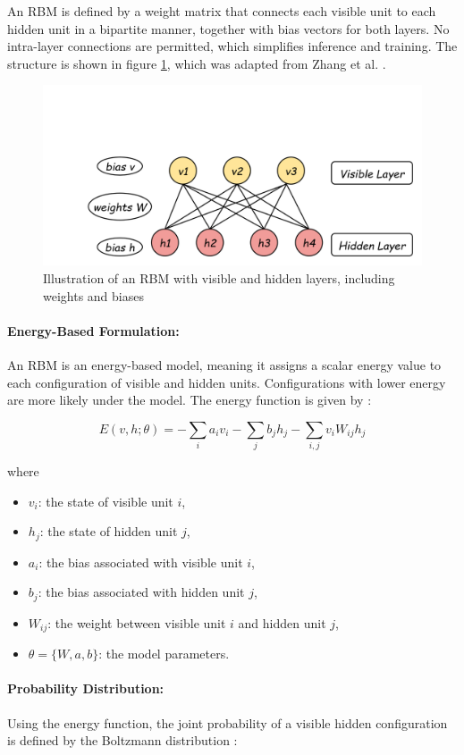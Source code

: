 An RBM is defined by a weight matrix that connects each visible unit to each hidden unit in a bipartite manner, together with bias vectors for both layers. No intra-layer connections are permitted, which simplifies inference and training. The structure is shown in figure \ref{fig:singlerbm}, which was adapted from Zhang et al. \cite{zhang2017deep}.

\begin{figure}[ht]
	\centering
	\includegraphics[width=0.7\linewidth]{Chapters/images/singleRBM}
	\caption{Illustration of an RBM with visible and hidden layers, including weights and biases \cite{zhang2017deep}}
	\label{fig:singlerbm}
\end{figure}

\paragraph{Energy-Based Formulation: } 
An RBM is an energy-based model, meaning it assigns a scalar energy value to each configuration of visible and hidden units. Configurations with lower energy are more likely under the model. The energy function is given by \cite{kong2019improved, zhang2016short}:

\[
E(v,h;\theta) = -\sum_i a_i v_i - \sum_j b_j h_j - \sum_{i,j} v_i W_{ij} h_j
\label{eqn:12}
\]

where
\begin{itemize}
	\item $v_i$: the state of visible unit $i$,
	\item $h_j$: the state of hidden unit $j$,
	\item $a_i$: the bias associated with visible unit $i$,
	\item $b_j$: the bias associated with hidden unit $j$,
	\item $W_{ij}$: the weight between visible unit $i$ and hidden unit $j$,
	\item $\theta = \{W, a, b\}$: the model parameters.
\end{itemize}

\paragraph{Probability Distribution: } 
Using the energy function, the joint probability of a visible hidden configuration is defined by the Boltzmann distribution \cite{DBN_GeeksforGeeks}:

